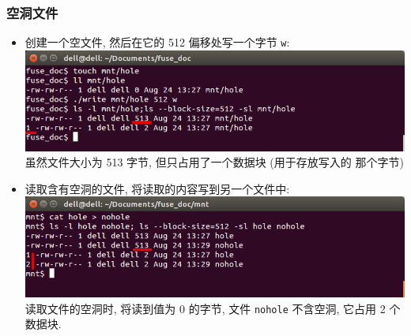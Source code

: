\documentclass[nofonts, titlepage]{ctexart}
\begin{document}
\subsubsection{空洞文件}
\begin{itemize}
    \item 创建一个空文件, 然后在它的 512 偏移处写一个字节 \verb'w': \\
        \includegraphics[width=14cm]{./images/./hole_t1.png} \\
        虽然文件大小为 513 字节, 但只占用了一个数据块 (用于存放写入的
        那个字节)
    \item 读取含有空洞的文件, 将读取的内容写到另一个文件中: \\
        \includegraphics[width=14cm]{./images/./hole_t2.png}\\
        读取文件的空洞时, 将读到值为 0 的字节, 文件 \verb'nohole' 不含空洞,
        它占用 2 个数据块.
\end{itemize}
\end{document}
